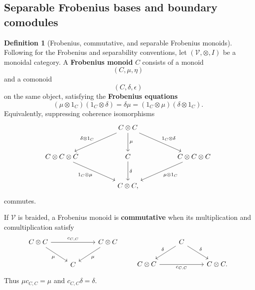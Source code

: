 \documentclass[oneside]{article}
\theoremstyle{plain}
\theoremstyle{definition}
\newtheorem{definition}[theorem]{Definition}
\theoremstyle{remark}
\begin{document}
\subsection{Separable Frobenius bases and boundary comodules}

\begin{definition}[Frobenius, commutative, and separable Frobenius monoids]
\label{def:cgqg-background-frobenius-monoid}
    Following \cite[\S A.4 and Def.~A.5]{PastroStreet2009} for the Frobenius
    and separability conventions, let \((\mathcal V,\otimes,I)\) be a monoidal category. A \textbf{Frobenius monoid} \(C\) consists of a monoid
    \[
        (C,\mu,\eta)
    \]
    and a comonoid
    \[
        (C,\delta,\epsilon)
    \]
    on the same object, satisfying the \textbf{Frobenius equations}
    \begin{equation}
        (\mu\otimes1_C)(1_C\otimes\delta)
        =
        \delta\mu
        =
        (1_C\otimes\mu)(\delta\otimes1_C).
        \label{eq:cgqg-background-frobenius}
    \end{equation}
    Equivalently, suppressing coherence isomorphisms
    \begin{equation*}
        \begin{tikzcd}[column sep=huge,row sep=large]
            && C\otimes C
            \arrow[dl,"\delta\otimes1_C"']
            \arrow[d,"\mu"]
            \arrow[dr,"1_C\otimes\delta"]
            && \\
            & C\otimes C\otimes C
            \arrow[dr,"1_C\otimes\mu"']
            & C
            \arrow[d,"\delta"]
            & C\otimes C\otimes C
            \arrow[dl,"\mu\otimes1_C"]
            & \\
            && C\otimes C,
            &&
        \end{tikzcd}
    \end{equation*}
    commutes.

    If \(\mathcal V\) is braided, a Frobenius monoid is \textbf{commutative} when its multiplication and comultiplication satisfy
    \begin{equation*}
        \begin{tikzcd}
            C\otimes C
                \arrow[rr,"c_{C,C}"]
                \arrow[dr,"\mu"']
            &&
            C\otimes C
                \arrow[dl,"\mu"]
            \\
            &
            C
        \end{tikzcd}
        \qquad
        \begin{tikzcd}
            &
            C
                \arrow[dl,"\delta"']
                \arrow[dr,"\delta"]
            &
            \\
            C\otimes C
                \arrow[rr,"c_{C,C}"']
            &&
            C\otimes C .
        \end{tikzcd}
    \end{equation*}
    Thus \(\mu c_{C,C}=\mu\) and \(c_{C,C}\delta=\delta\).


\end{definition}
\end{document}
